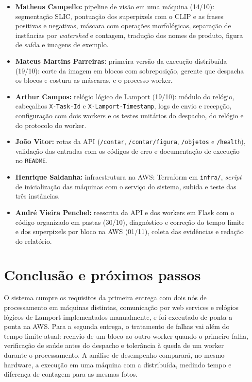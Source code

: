 \documentclass{sbc2023}
\begin{document}
\begin{itemize}
\item \textbf{Matheus Campello:} pipeline de visão em uma máquina (14/10): segmentação SLIC, pontuação dos superpixels com o CLIP e as frases positivas e negativas, máscara com operações morfológicas, separação de instâncias por \emph{watershed} e contagem, tradução dos nomes de produto, figura de saída e imagens de exemplo.
\item \textbf{Mateus Martins Parreiras:} primeira versão da execução distribuída (19/10): corte da imagem em blocos com sobreposição, gerente que despacha os blocos e costura as máscaras, e o processo worker.
\item \textbf{Arthur Campos:} relógio lógico de Lamport (19/10): módulo do relógio, cabeçalhos \texttt{X-Task-Id} e \texttt{X-Lamport-Timestamp}, logs de envio e recepção, configuração com dois workers e os testes unitários do despacho, do relógio e do protocolo do worker.
\item \textbf{João Vitor:} rotas da API (\texttt{/contar}, \texttt{/contar/figura}, \texttt{/objetos} e \texttt{/health}), validação das entradas com os códigos de erro e documentação de execução no \texttt{README}.
\item \textbf{Henrique Saldanha:} infraestrutura na AWS: Terraform em \texttt{infra/}, \emph{script} de inicialização das máquinas com o serviço do sistema, subida e teste das três instâncias.
\item \textbf{André Vieira Penchel:} reescrita da API e dos workers em Flask com o código organizado em pastas (30/10), diagnóstico e correção do tempo limite e dos superpixels por bloco na AWS (01/11), coleta das evidências e redação do relatório.
\end{itemize}

\section{Conclusão e próximos passos}

O sistema cumpre os requisitos da primeira entrega com dois nós de processamento em máquinas distintas, comunicação por web services e relógios lógicos de Lamport implementados manualmente, e foi executado de ponta a ponta na AWS. Para a segunda entrega, o tratamento de falhas vai além do tempo limite atual: reenvio de um bloco ao outro worker quando o primeiro falha, verificação de saúde antes do despacho e tolerância à queda de um worker durante o processamento. A análise de desempenho comparará, no mesmo hardware, a execução em uma máquina com a distribuída, medindo tempo e diferença de contagem para as mesmas fotos.



\end{document}
